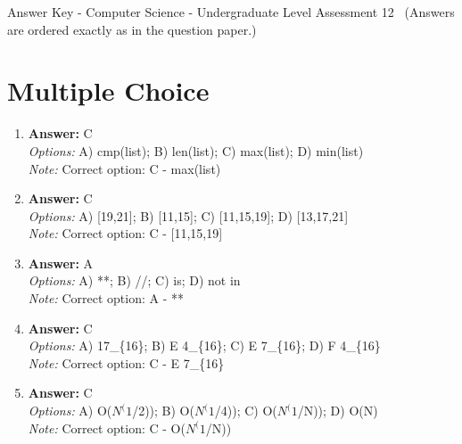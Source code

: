 \documentclass[12pt]{article}
\begin{document}
\begin{center}
Answer Key - Computer Science - Undergraduate Level Assessment 12 \
\small (Answers are ordered exactly as in the question paper.)
\end{center}

\section*{Multiple Choice}
\begin{enumerate}[label=\arabic*.]
\item \textbf{Answer:} C
\\ \textit{Options:} A) cmp(list); B) len(list); C) max(list); D) min(list)
\\ \textit{Note:} Correct option: C - max(list)
\item \textbf{Answer:} C
\\ \textit{Options:} A) [19,21]; B) [11,15]; C) [11,15,19]; D) [13,17,21]
\\ \textit{Note:} Correct option: C - [11,15,19]
\item \textbf{Answer:} A
\\ \textit{Options:} A) **; B) //; C) is; D) not in
\\ \textit{Note:} Correct option: A - **
\item \textbf{Answer:} C
\\ \textit{Options:} A) 17\_\{16\}; B) E 4\_\{16\}; C) E 7\_\{16\}; D) F 4\_\{16\}
\\ \textit{Note:} Correct option: C - E 7\_\{16\}
\item \textbf{Answer:} C
\\ \textit{Options:} A) O($N^(1$/2)); B) O($N^(1$/4)); C) O($N^(1$/N)); D) O(N)
\\ \textit{Note:} Correct option: C - O($N^(1$/N))
\end{enumerate}
\end{document}
